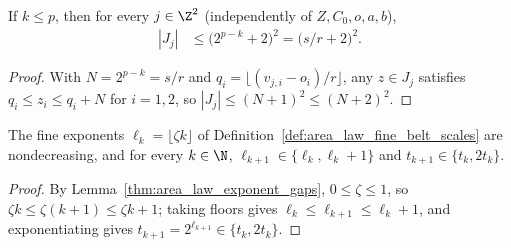\begin{lemma}
    \label{thm:area_law_primary_fragment_count}
    \leanok
    If $k\le p$, then for every $j\in\Z^2$ (independently of $Z,C_0,o,a,b$),
    \begin{align}
        |J_j| & \le\bigl(2^{p-k}+2\bigr)^2
        =\bigl(s/r+2\bigr)^2.
        \label{eq:area_law_primary_fragment_count}
    \end{align}
\end{lemma}
\begin{proof}\leanok
    With $N=2^{p-k}=s/r$ and $q_i=\lfloor(v_{j,i}-o_i)/r\rfloor$, any
    $z\in J_j$ satisfies $q_i\le z_i\le q_i+N$ for $i=1,2$, so
    $|J_j|\le(N+1)^2\le(N+2)^2$.
\end{proof}

\begin{lemma}
    \label{thm:area_law_adjacent_fine_meshes}
    \leanok
    The fine exponents $\ell_k=\lfloor\zeta k\rfloor$ of
    Definition~\ref{def:area_law_fine_belt_scales} are nondecreasing, and for
    every $k\in\N$, $\ell_{k+1}\in\{\ell_k,\ell_k+1\}$ and
    $t_{k+1}\in\{t_k,2t_k\}$.
\end{lemma}
\begin{proof}\leanok
    By Lemma~\ref{thm:area_law_exponent_gaps}, $0\le\zeta\le1$, so
    $\zeta k\le\zeta(k+1)\le\zeta k+1$; taking floors gives
    $\ell_k\le\ell_{k+1}\le\ell_k+1$, and exponentiating gives
    $t_{k+1}=2^{\ell_{k+1}}\in\{t_k,2t_k\}$.
\end{proof}
